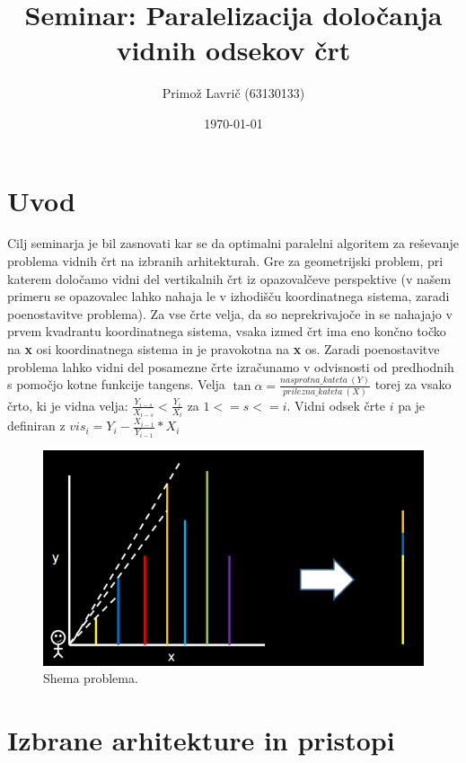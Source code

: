 \documentclass[a4paper,11pt]{article}
\title{Seminar: Paralelizacija določanja vidnih odsekov črt}
\author{Primož Lavrič (63130133)}
\date{\today}
\begin{document}
\maketitle

\section{Uvod}

Cilj seminarja je bil zasnovati kar se da optimalni paralelni algoritem za reševanje problema vidnih črt na izbranih arhitekturah. Gre za geometrijski problem, pri katerem določamo vidni del vertikalnih črt iz opazovalčeve perspektive (v našem primeru se opazovalec lahko nahaja le v izhodišču koordinatnega sistema, zaradi poenostavitve problema). Za vse črte velja, da so neprekrivajoče in se nahajajo v prvem kvadrantu koordinatnega sistema, vsaka izmed črt ima eno končno točko na \textbf{x} osi koordinatnega sistema in je pravokotna na \textbf{x} os. Zaradi poenostavitve problema lahko vidni del posamezne črte izračunamo v odvisnosti od predhodnih s pomočjo kotne funkcije tangens. Velja $\tan \alpha =\frac{nasprotna\_kateta\ (Y)}{prilezna\_kateta\ (X)}$ torej za vsako črto, ki je vidna velja: $\frac{Y_{i-s}}{X_{i-s}} < \frac{Y_{i}}{X_{i}}$ za $1 <= s <= i$. Vidni odsek črte $i$ pa je definiran z $vis_{i} = Y_{i} - \frac{X_{i-1}}{Y_{i-1}} * X_{i}$

\begin{figure}[htbp]
\begin{center}
\includegraphics[scale=0.5]{slika-problema.png}
\caption{Shema problema.}
\label{slika1}
\end{center}
\end{figure}

\pagebreak
\section{Izbrane arhitekture in pristopi}
\end{document}
